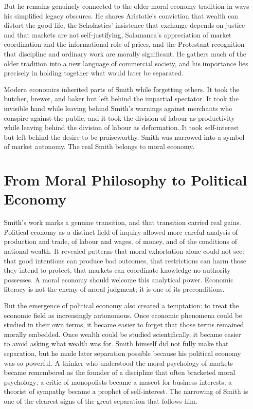 \documentclass[11pt,a4paper,oneside]{book}
\begin{document}
But he remains genuinely connected to the older moral economy tradition in ways his simplified legacy obscures. He shares Aristotle's conviction that wealth can distort the good life, the Scholastics' insistence that exchange depends on justice and that markets are not self-justifying, Salamanca's appreciation of market coordination and the informational role of prices, and the Protestant recognition that discipline and ordinary work are morally significant. He gathers much of the older tradition into a new language of commercial society, and his importance lies precisely in holding together what would later be separated.

Modern economics inherited parts of Smith while forgetting others. It took the butcher, brewer, and baker but left behind the impartial spectator. It took the invisible hand while leaving behind Smith's warnings against merchants who conspire against the public, and it took the division of labour as productivity while leaving behind the division of labour as deformation. It took self-interest but left behind the desire to be praiseworthy. Smith was narrowed into a symbol of market autonomy. The real Smith belongs to moral economy.

\section*{From Moral Philosophy to Political Economy}

Smith's work marks a genuine transition, and that transition carried real gains. Political economy as a distinct field of inquiry allowed more careful analysis of production and trade, of labour and wages, of money, and of the conditions of national wealth. It revealed patterns that moral exhortation alone could not see: that good intentions can produce bad outcomes, that restrictions can harm those they intend to protect, that markets can coordinate knowledge no authority possesses. A moral economy should welcome this analytical power. Economic literacy is not the enemy of moral judgment; it is one of its preconditions.

But the emergence of political economy also created a temptation: to treat the economic field as increasingly autonomous. Once economic phenomena could be studied in their own terms, it became easier to forget that those terms remained morally embedded. Once wealth could be studied scientifically, it became easier to avoid asking what wealth was for. Smith himself did not fully make that separation, but he made later separation possible because his political economy was so powerful. A thinker who understood the moral psychology of markets became remembered as the founder of a discipline that often bracketed moral psychology; a critic of monopolists became a mascot for business interests; a theorist of sympathy became a prophet of self-interest. The narrowing of Smith is one of the clearest signs of the great separation that follows him.
\end{document}
